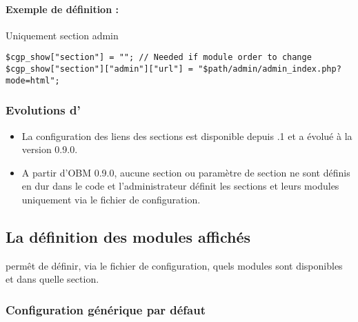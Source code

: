 \paragraph{Exemple de définition :} Uniquement section admin
\begin{verbatim}
$cgp_show["section"] = ""; // Needed if module order to change
$cgp_show["section"]["admin"]["url"] = "$path/admin/admin_index.php?mode=html";
\end{verbatim}


\subsubsection{Evolutions d'\obm}

\begin{itemize}
\item La configuration des liens des sections est disponible depuis .1 et a évolué à la version 0.9.0.
\item A partir d'OBM 0.9.0, aucune section ou paramètre de section ne sont définis en dur dans le code et l'administrateur définit les sections et leurs modules uniquement via le fichier de configuration.
\end{itemize}


\subsection{La définition des modules affichés}
\label{cgp_show_module}

\obm permêt de définir, via le fichier de configuration, quels modules sont disponibles et dans quelle section.


\subsubsection{Configuration générique par défaut}

